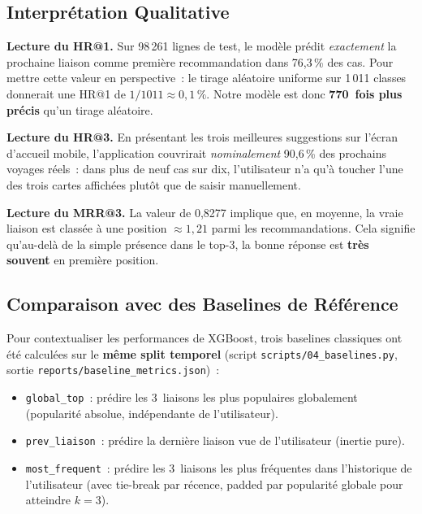 \documentclass[11pt, a4paper]{article}
\begin{document}
\subsection{Interprétation Qualitative}

\textbf{Lecture du HR@1.} Sur 98\,261 lignes de test, le modèle prédit
\textit{exactement} la prochaine liaison comme première recommandation
dans 76{,}3\,\% des cas. Pour mettre cette valeur en perspective~:
le tirage aléatoire uniforme sur 1\,011 classes donnerait une HR@1 de
$1/1011 \approx 0{,}1\,\%$. Notre modèle est donc \textbf{770~fois plus
précis} qu'un tirage aléatoire.

\textbf{Lecture du HR@3.} En présentant les trois meilleures
suggestions sur l'écran d'accueil mobile, l'application couvrirait
\textit{nominalement} 90{,}6\,\% des prochains voyages réels~: dans plus
de neuf cas sur dix, l'utilisateur n'a qu'à toucher l'une des trois
cartes affichées plutôt que de saisir manuellement.

\textbf{Lecture du MRR@3.} La valeur de 0{,}8277 implique que, en
moyenne, la vraie liaison est classée à une position $\approx 1{,}21$
parmi les recommandations. Cela signifie qu'au-delà de la simple
présence dans le top-3, la bonne réponse est \textbf{très souvent} en
première position.

\subsection{Comparaison avec des Baselines de Référence}

Pour contextualiser les performances de XGBoost, trois baselines
classiques ont été calculées sur le \textbf{même split temporel}
(script \texttt{scripts/04\_baselines.py}, sortie
\texttt{reports/baseline\_metrics.json})~:

\begin{itemize}
\item \texttt{global\_top}~: prédire les 3~liaisons les plus populaires
    globalement (popularité absolue, indépendante de l'utilisateur).
\item \texttt{prev\_liaison}~: prédire la dernière liaison vue de
    l'utilisateur (inertie pure).
\item \texttt{most\_frequent}~: prédire les 3~liaisons les plus
    fréquentes dans l'historique de l'utilisateur (avec tie-break par
    récence, padded par popularité globale pour atteindre $k=3$).
\end{itemize}
\end{document}
